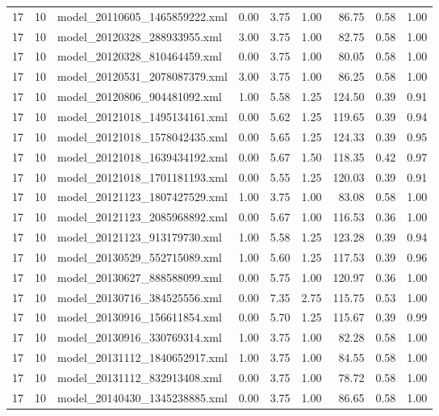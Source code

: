 \begin{table}[ht]
\begin{tabular}{rrlrrrrrr}
   17 &  10 & model\_20110605\_1465859222.xml & 0.00 & 3.75 & 1.00 & 86.75 & 0.58 & 1.00 \\ 
   17 &  10 & model\_20120328\_288933955.xml & 3.00 & 3.75 & 1.00 & 82.75 & 0.58 & 1.00 \\ 
   17 &  10 & model\_20120328\_810464459.xml & 0.00 & 3.75 & 1.00 & 80.05 & 0.58 & 1.00 \\ 
   17 &  10 & model\_20120531\_2078087379.xml & 3.00 & 3.75 & 1.00 & 86.25 & 0.58 & 1.00 \\ 
   17 &  10 & model\_20120806\_904481092.xml & 1.00 & 5.58 & 1.25 & 124.50 & 0.39 & 0.91 \\ 
   17 &  10 & model\_20121018\_1495134161.xml & 0.00 & 5.62 & 1.25 & 119.65 & 0.39 & 0.94 \\ 
   17 &  10 & model\_20121018\_1578042435.xml & 0.00 & 5.65 & 1.25 & 124.33 & 0.39 & 0.95 \\ 
   17 &  10 & model\_20121018\_1639434192.xml & 0.00 & 5.67 & 1.50 & 118.35 & 0.42 & 0.97 \\ 
   17 &  10 & model\_20121018\_1701181193.xml & 0.00 & 5.55 & 1.25 & 120.03 & 0.39 & 0.91 \\ 
   17 &  10 & model\_20121123\_1807427529.xml & 1.00 & 3.75 & 1.00 & 83.08 & 0.58 & 1.00 \\ 
   17 &  10 & model\_20121123\_2085968892.xml & 0.00 & 5.67 & 1.00 & 116.53 & 0.36 & 1.00 \\ 
   17 &  10 & model\_20121123\_913179730.xml & 1.00 & 5.58 & 1.25 & 123.28 & 0.39 & 0.94 \\ 
   17 &  10 & model\_20130529\_552715089.xml & 1.00 & 5.60 & 1.25 & 117.53 & 0.39 & 0.96 \\ 
   17 &  10 & model\_20130627\_888588099.xml & 0.00 & 5.75 & 1.00 & 120.97 & 0.36 & 1.00 \\ 
   17 &  10 & model\_20130716\_384525556.xml & 0.00 & 7.35 & 2.75 & 115.75 & 0.53 & 1.00 \\ 
   17 &  10 & model\_20130916\_156611854.xml & 0.00 & 5.70 & 1.25 & 115.67 & 0.39 & 0.99 \\ 
   17 &  10 & model\_20130916\_330769314.xml & 1.00 & 3.75 & 1.00 & 82.28 & 0.58 & 1.00 \\ 
   17 &  10 & model\_20131112\_1840652917.xml & 1.00 & 3.75 & 1.00 & 84.55 & 0.58 & 1.00 \\ 
   17 &  10 & model\_20131112\_832913408.xml & 0.00 & 3.75 & 1.00 & 78.72 & 0.58 & 1.00 \\ 
   17 &  10 & model\_20140430\_1345238885.xml & 0.00 & 3.75 & 1.00 & 86.65 & 0.58 & 1.00 \\ 

\end{tabular}
\end{table}
